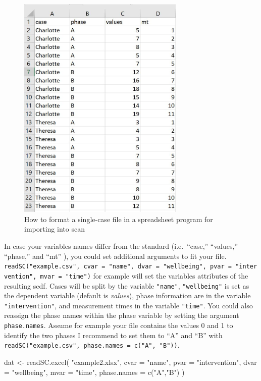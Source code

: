 \documentclass[
]{book}
\newenvironment{Shaded}{\begin{snugshade}}{\end{snugshade}}
\newcommand{\AttributeTok}[1]{\textcolor[rgb]{0.77,0.63,0.00}{#1}}
\newcommand{\FunctionTok}[1]{\textcolor[rgb]{0.00,0.00,0.00}{#1}}
\newcommand{\NormalTok}[1]{#1}
\newcommand{\OtherTok}[1]{\textcolor[rgb]{0.56,0.35,0.01}{#1}}
\newcommand{\StringTok}[1]{\textcolor[rgb]{0.31,0.60,0.02}{#1}}
\begin{document}
\begin{figure}
\centering
\includegraphics[width=3.125in,height=\textheight]{images/readSC.jpg}
\caption{How to format a single-case file in a spreadsheet program for importing into scan}
\end{figure}

In case your variables names differ from the standard (i.e.~``case,'' ``values,'' ``phase,'' and ``mt'' ), you could set additional arguments to fit your file. \texttt{readSC("example.csv",\ cvar\ =\ "name",\ dvar\ =\ "wellbeing",\ pvar\ =\ "intervention",\ mvar\ =\ "time")} for example will set the variables attributes of the resulting scdf. Cases will be split by the variable \texttt{"name"}, \texttt{"wellbeing"} is set as the dependent variable (default is \emph{values}), phase information are in the variable \texttt{"intervention"}, and measurement times in the variable \texttt{"time"}. You could also reassign the phase names within the phase variable by setting the argument \texttt{phase.names}. Assume for example your file contains the values 0 and 1 to identify the two phases I recommend to set them to ``A'' and ``B'' with \texttt{readSC("example.csv",\ phase.names\ =\ c("A",\ "B"))}.

\begin{Shaded}
\begin{Highlighting}[]
\NormalTok{dat }\OtherTok{\textless{}{-}} \FunctionTok{readSC.excel}\NormalTok{(}
  \StringTok{"example2.xlsx"}\NormalTok{, }\AttributeTok{cvar =} \StringTok{"name"}\NormalTok{, }\AttributeTok{pvar =} \StringTok{"intervention"}\NormalTok{, }
  \AttributeTok{dvar =} \StringTok{"wellbeing"}\NormalTok{, }\AttributeTok{mvar =} \StringTok{"time"}\NormalTok{, }\AttributeTok{phase.names =} \FunctionTok{c}\NormalTok{(}\StringTok{"A"}\NormalTok{,}\StringTok{"B"}\NormalTok{)}
\NormalTok{)}
\end{Highlighting}
\end{Shaded}
\end{document}
